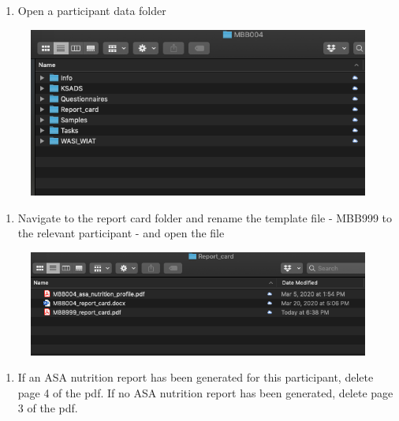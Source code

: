 \documentclass[]{book}
\providecommand{\tightlist}{%
  \setlength{\itemsep}{0pt}\setlength{\parskip}{0pt}}
\begin{document}
\begin{enumerate}
\def\labelenumi{\arabic{enumi}.}
\tightlist
\item
  Open a participant data folder
\end{enumerate}

\begin{figure}
\centering
\includegraphics{images/final_checklist/report_cards/1.png}
\caption{}
\end{figure}

\begin{enumerate}
\def\labelenumi{\arabic{enumi}.}
\setcounter{enumi}{1}
\tightlist
\item
  Navigate to the report card folder and rename the template file - MBB999 to the relevant participant - and open the file
\end{enumerate}

\begin{figure}
\centering
\includegraphics{images/final_checklist/report_cards/2.png}
\caption{}
\end{figure}

\begin{enumerate}
\def\labelenumi{\arabic{enumi}.}
\setcounter{enumi}{2}
\tightlist
\item
  If an ASA nutrition report has been generated for this participant, delete page 4 of the pdf. If no ASA nutrition report has been generated, delete page 3 of the pdf.
\end{enumerate}
\end{document}
